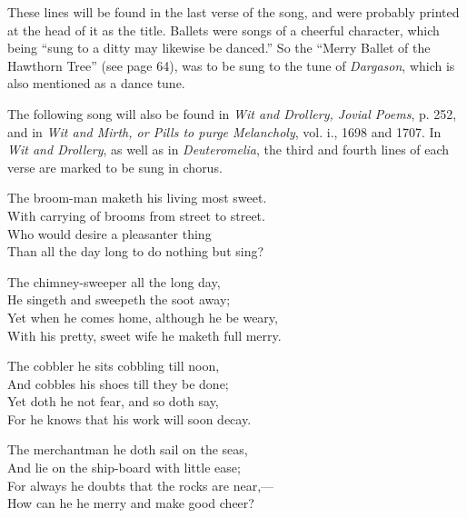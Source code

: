 These lines will be found in the last verse of the song, and were probably printed
at the head of it as the title. Ballets were songs of a cheerful character, which
being “sung to a ditty may likewise be danced.” So the “Merry Ballet of the
Hawthorn Tree” (see page 64), was to be sung to the tune of \textit{Dargason}, which is
also mentioned as a dance tune.

The following song will also be found in \textit{Wit and Drollery, Jovial Poems}, p. 252,
and in \textit{Wit and Mirth, or\textit{ Pills to purge Melancholy}}, vol. i., 1698 and 1707. In
\textit{Wit and Drollery}, as well as in \textit{Deuteromelia}, the third and fourth lines of each
verse are marked to be sung in chorus.


\bigskip



\begin{scverse}
\begin{patverse}
The broom-man maketh his living most sweet.\\
With carrying of brooms from street to street.\\
Who would desire a pleasanter thing\\
Than all the day long to do nothing but sing?
\end{patverse}

The chimney-sweeper all the long day,\\
He singeth and sweepeth the soot away;\\
Yet when he comes home, although he be weary,\\
With his pretty, sweet wife he maketh full merry.

The cobbler he sits cobbling till noon,\\
And cobbles his shoes till they be done;\\
Yet doth he not fear, and so doth say,\\
For he knows that his work will soon decay.

The merchantman he doth sail on the seas,\\
And lie on the ship-board with little ease;\\
For always he doubts that the rocks are near,—\\
How can he he merry and make good cheer?
\end{scverse}

\pagebreak

